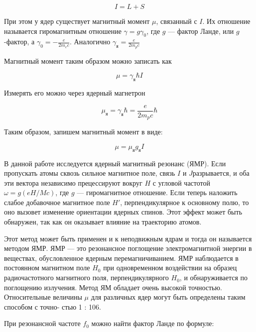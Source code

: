\documentclass[12pt]{kiarticle}
\begin{document}
	\begin{equation}\label{}
	I = L + S
	\end{equation} 
	
	При этом у ядер существует магнитный момент $ \mu $, связанный с $ I $. Их отношение называется гиромагнитным отношение $ \gamma = g \gamma_0 $, где $ g $ --- фактор Ланде, или $ g $-фактор, а $ \gamma_0 = -\frac{e}{2m_ec} $. Аналогично  $ \gamma_я = \frac{e}{2m_pc} $
	
	Магнитный момент таким образом можно записать как 
	
	\begin{equation}\label{}
	\mu = \gamma_я \hbar I 
	\end{equation}
	
	Измерять его можно через ядерный магнетрон
	
	\begin{equation}\label{}
	\mu_я = \gamma_я \hbar = \frac{e}{2m_pc} \hbar 
	\end{equation}
	
	Таким образом, запишем магнитный момент в виде:
	
	\begin{equation}\label{mu}
	\mu = \mu_я g_я I
	\end{equation}

	
	В данной работе исследуется ядерный магнитный резонанс (ЯМР). Если пропускать
	атомы сквозь сильное магнитное поле, связь $ I $ и $ J  $разрывается, и
	оба эти вектора независимо прецессируют вокруг $ H $ с угловой частотой
	$ \omega = g(eH/Mc) $, где $ g $ --- гиромагнитное отношение. Если теперь наложить слабое добавочное магнитное поле $ H' $, перпендикулярное к основному полю, то оно вызовет изменение ориентации ядерных спинов.
	Этот эффект может быть обнаружен, так как он оказывает влияние
	на траекторию атомов.
	
	Этот метод может быть применен и к неподвижным ядрам и тогда он называется методом ЯМР. ЯМР --- это резонансное поглощение
	электромагнитной энергии в веществах, обусловленное ядерным перемагничиванием. ЯМР наблюдается в постоянном магнитном поле $ H_0 $ при одновременном воздействии на образец радиочастотного магнитного поля, перпендикулярного $ H_0 $, и обнаруживается по поглощению излучения. Метод
	ЯМ обладает очень высокой точностью. Относительные величины $ \mu $
	для различных ядер могут быть определены таким способом с точно-
	стью 1 : 106.
	
	При резонансной частоте $ f_0 $ можно найти фактор Ланде по формуле:
	
\end{document}
